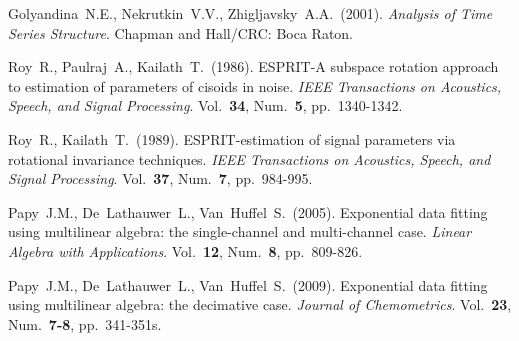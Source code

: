 \documentclass[12pt]{article}
\theoremstyle{definition}
\theoremstyle{remark}
\begin{document}
\begin{thebibliography}{10}
  Golyandina~N.E., Nekrutkin~V.V., Zhigljavsky~A.A.~(2001).
  {\sl Analysis of Time Series Structure}.
  Chapman and Hall/CRC: Boca Raton.

  Roy~R., Paulraj~A., Kailath~T.~(1986).
  ESPRIT-A subspace rotation approach to estimation of parameters of
  cisoids in noise.
  {\sl IEEE Transactions on Acoustics, Speech, and Signal Processing}.
  Vol.~{\bf 34}, Num.~{\bf 5},
  pp.~1340-1342.

  Roy~R., Kailath~T.~(1989).
  ESPRIT-estimation of signal parameters via rotational invariance techniques.
  {\sl IEEE Transactions on Acoustics, Speech, and Signal Processing}.
  Vol.~{\bf 37}, Num.~{\bf 7},
  pp.~984-995.

  Papy~J.M., De~Lathauwer~L., Van~Huffel~S.~(2005).
  Exponential data fitting using multilinear algebra: the
  single-channel and multi-channel case.
  {\sl Linear Algebra with Applications}. Vol.~{\bf 12}, Num.~{\bf 8},
  pp.~809-826.

  Papy~J.M., De~Lathauwer~L., Van~Huffel~S.~(2009).
  Exponential data fitting using multilinear algebra: the decimative case.
  {\sl Journal of Chemometrics}. Vol.~{\bf 23}, Num.~{\bf 7-8},
  pp.~341-351s.




\end{thebibliography}
\end{document}
